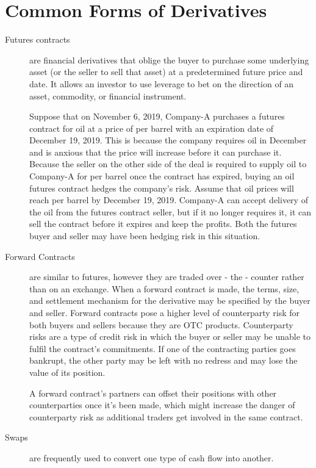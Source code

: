 \documentclass[a4 paper, 12pt]{report}
\theoremstyle{plain}
\begin{document}
\section{Common Forms of Derivatives}
\begin{description}
\item[Futures contracts] are financial derivatives that oblige the buyer to
purchase some underlying asset (or the seller to sell that asset) at a predetermined
future price and date. It allows an investor to use leverage to bet on the direction of an
asset, commodity, or financial instrument.\\
\par Suppose that on November 6, 2019, Company-A purchases a futures contract for
oil at a price of  per barrel with an expiration date of December 19, 2019. This is
because the company requires oil in December and is anxious that the price will increase
before it can purchase it. Because the seller on the other side of the deal is required to
supply oil to Company-A for  per barrel once the contract has expired, buying an
oil futures contract hedges the company's risk. Assume that oil prices will reach  per
barrel by December 19, 2019. Company-A can accept delivery of the oil from the futures
contract seller, but if it no longer requires it, it can sell the contract before it expires and
keep the profits. Both the futures buyer and seller may have been hedging risk in this
situation.
\item[Forward Contracts] are similar to futures, however they are traded over - 
the - counter rather than on an exchange. When a forward contract is made, the terms,
size, and settlement mechanism for the derivative may be specified by the buyer and
seller. Forward contracts pose a higher level of counterparty risk for both buyers and
sellers because they are OTC products. Counterparty risks are a type of credit risk in
which the buyer or seller may be unable to fulfil the contract's commitments. If one of
the contracting parties goes bankrupt, the other party may be left with no redress and
may lose the value of its position.\\
\par A forward contract's partners can offset their positions with other counterparties
once it's been made, which might increase the danger of counterparty risk as additional
traders get involved in the same contract.
\item[Swaps] are frequently used to convert one type of cash flow into another.

\end{description}
\end{document}
